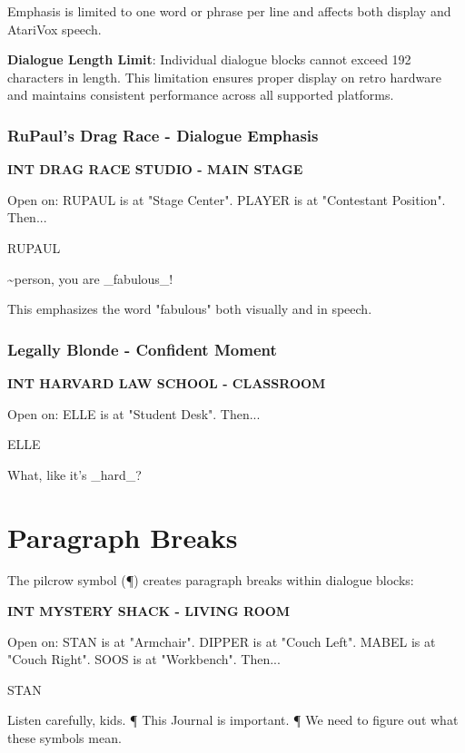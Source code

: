 \documentclass[11pt,letterpaper,oldstylefigures]{memoir}
\newcommand{\slugline}[1]{\nobreak\textbf{\MakeUppercase{#1}}\par\nobreak\vspace{1\baselineskip}}
\newcommand{\speaker}[1]{\nobreak\hspace*{0.333\textwidth}\MakeUppercase{#1}\par\nobreak\vspace{0.5\baselineskip}}
\newcommand{\dialogue}[1]{\nobreak\hspace*{0.25\textwidth}\begin{minipage}{0.5\textwidth}#1\end{minipage}\par\vspace{1\baselineskip}}
\newcommand{\stagedir}[1]{#1\par\vspace{1\baselineskip}}
\newenvironment{FountainExample}
  {\begingroup
  \ttfamily\small
   \setlength{\parindent}{0pt}
  \setlength{\parskip}{0.5em}
  \allowdisplaybreaks
  \setlength{\displaywidowpenalty}{0}
  \setlength{\widowpenalty}{0}
  \setlength{\clubpenalty}{0}
  \setlength{\interlinepenalty}{0}
}
  {\endgroup}
\begin{document}
Emphasis is limited to one word or phrase per line and affects both display and AtariVox speech.

\textbf{Dialogue Length Limit}: Individual dialogue blocks cannot exceed 192 characters in length. This limitation ensures proper display on retro hardware and maintains consistent performance across all supported platforms.

\subsubsection*{RuPaul's Drag Race - Dialogue Emphasis}
\label{ex:rupauls-drag-race-dialogue}

\begin{FountainExample}
\slugline{INT DRAG RACE STUDIO - MAIN STAGE}

\stagedir{Open on: RUPAUL is at "Stage Center". PLAYER is at "Contestant Position". Then...}

\speaker{RUPAUL}
\dialogue{\textasciitilde{}person, you are \_fabulous\_!}
\end{FountainExample}

This emphasizes the word "fabulous" both visually and in speech.

\subsubsection*{Legally Blonde - Confident Moment}
\label{ex:legally-blonde-confident-moment}

\begin{FountainExample}
\slugline{INT HARVARD LAW SCHOOL - CLASSROOM}

\stagedir{Open on: ELLE is at "Student Desk". Then...}

\speaker{ELLE}
\dialogue{What, like it's \_hard\_?}
\end{FountainExample}

\section{Paragraph Breaks}

The pilcrow symbol (¶) creates paragraph breaks within dialogue blocks:

\begin{FountainExample}
\slugline{INT MYSTERY SHACK - LIVING ROOM}

\stagedir{Open on: STAN is at "Armchair". DIPPER is at "Couch Left". MABEL is at "Couch Right". SOOS is at "Workbench". Then...}

\speaker{STAN}
\dialogue{Listen carefully, kids. ¶ This Journal is important. ¶ We need to figure out what these symbols mean.}
\end{FountainExample}
\end{document}
